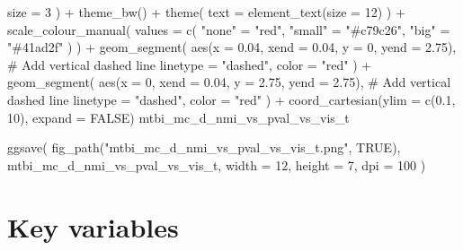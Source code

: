 \documentclass[
  letterpaper,
  DIV=11,
  numbers=noendperiod]{scrreprt}
\newenvironment{Shaded}{\begin{snugshade}}{\end{snugshade}}
\newcommand{\AttributeTok}[1]{\textcolor[rgb]{0.40,0.45,0.13}{#1}}
\newcommand{\CommentTok}[1]{\textcolor[rgb]{0.37,0.37,0.37}{#1}}
\newcommand{\ConstantTok}[1]{\textcolor[rgb]{0.56,0.35,0.01}{#1}}
\newcommand{\DecValTok}[1]{\textcolor[rgb]{0.68,0.00,0.00}{#1}}
\newcommand{\FloatTok}[1]{\textcolor[rgb]{0.68,0.00,0.00}{#1}}
\newcommand{\FunctionTok}[1]{\textcolor[rgb]{0.28,0.35,0.67}{#1}}
\newcommand{\NormalTok}[1]{\textcolor[rgb]{0.00,0.23,0.31}{#1}}
\newcommand{\OtherTok}[1]{\textcolor[rgb]{0.00,0.23,0.31}{#1}}
\newcommand{\SpecialCharTok}[1]{\textcolor[rgb]{0.37,0.37,0.37}{#1}}
\newcommand{\StringTok}[1]{\textcolor[rgb]{0.13,0.47,0.30}{#1}}
\begin{document}
\begin{Shaded}
\begin{Highlighting}[]
        \AttributeTok{size =} \DecValTok{3}
\NormalTok{    ) }\SpecialCharTok{+}
    \FunctionTok{theme\_bw}\NormalTok{() }\SpecialCharTok{+}
    \FunctionTok{theme}\NormalTok{(}
        \AttributeTok{text =} \FunctionTok{element\_text}\NormalTok{(}\AttributeTok{size =} \DecValTok{12}\NormalTok{)}
\NormalTok{    ) }\SpecialCharTok{+}
    \FunctionTok{scale\_colour\_manual}\NormalTok{(}
        \AttributeTok{values =} \FunctionTok{c}\NormalTok{(}
            \StringTok{"none"} \OtherTok{=} \StringTok{"red"}\NormalTok{,}
            \StringTok{"small"} \OtherTok{=} \StringTok{"\#c79c26"}\NormalTok{,}
            \StringTok{"big"} \OtherTok{=} \StringTok{"\#41ad2f"}
\NormalTok{        )}
\NormalTok{    ) }\SpecialCharTok{+}
    \FunctionTok{geom\_segment}\NormalTok{(}
        \FunctionTok{aes}\NormalTok{(}\AttributeTok{x =} \FloatTok{0.04}\NormalTok{, }\AttributeTok{xend =} \FloatTok{0.04}\NormalTok{, }\AttributeTok{y =} \DecValTok{0}\NormalTok{, }\AttributeTok{yend =} \FloatTok{2.75}\NormalTok{),  }\CommentTok{\# Add vertical dashed line}
        \AttributeTok{linetype =} \StringTok{"dashed"}\NormalTok{,}
        \AttributeTok{color =} \StringTok{"red"}
\NormalTok{    ) }\SpecialCharTok{+}
    \FunctionTok{geom\_segment}\NormalTok{(}
        \FunctionTok{aes}\NormalTok{(}\AttributeTok{x =} \DecValTok{0}\NormalTok{, }\AttributeTok{xend =} \FloatTok{0.04}\NormalTok{, }\AttributeTok{y =} \FloatTok{2.75}\NormalTok{, }\AttributeTok{yend =} \FloatTok{2.75}\NormalTok{),  }\CommentTok{\# Add vertical dashed line}
        \AttributeTok{linetype =} \StringTok{"dashed"}\NormalTok{,}
        \AttributeTok{color =} \StringTok{"red"}
\NormalTok{    ) }\SpecialCharTok{+}
    \FunctionTok{coord\_cartesian}\NormalTok{(}\AttributeTok{ylim =} \FunctionTok{c}\NormalTok{(}\FloatTok{0.1}\NormalTok{, }\DecValTok{10}\NormalTok{), }\AttributeTok{expand =} \ConstantTok{FALSE}\NormalTok{)}
\NormalTok{mtbi\_mc\_d\_nmi\_vs\_pval\_vs\_vis\_t}

\FunctionTok{ggsave}\NormalTok{(}
    \FunctionTok{fig\_path}\NormalTok{(}\StringTok{"mtbi\_mc\_d\_nmi\_vs\_pval\_vs\_vis\_t.png"}\NormalTok{, }\ConstantTok{TRUE}\NormalTok{),}
\NormalTok{    mtbi\_mc\_d\_nmi\_vs\_pval\_vs\_vis\_t,}
    \AttributeTok{width =} \DecValTok{12}\NormalTok{,}
    \AttributeTok{height =} \DecValTok{7}\NormalTok{,}
    \AttributeTok{dpi =} \DecValTok{100}
\NormalTok{)}
\end{Highlighting}
\end{Shaded}

\section{Key variables}\label{key-variables}
\end{document}
